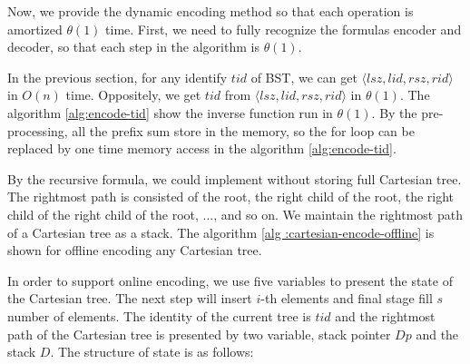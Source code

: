 Now, we provide the dynamic encoding method so that each operation is
amortized $\theta(1)$ time.  First, we need to fully recognize the
formulas encoder and decoder, so that each step in the algorithm is
$\theta(1)$.

In the previous section, for any identify $\mathit{tid}$ of BST, we
can get $\langle\mathit{lsz}, \mathit{lid}, \mathit{rsz},
\mathit{rid}\rangle$ in $O(n)$ time.  Oppositely, we get
$\mathit{tid}$ from $\langle\mathit{lsz}, \mathit{lid}, \mathit{rsz},
\mathit{rid}\rangle$ in $\theta(1)$.  The algorithm
\ref{alg:encode-tid} show the inverse function run in $\theta(1)$.  By
the pre-processing, all the prefix sum store in the memory, so the for
loop can be replaced by one time memory access in the algorithm
\ref{alg:encode-tid}.

\iffalse

接下來的幾段中，我們提供動態的編碼方式使得每一操作皆均攤 $\theta(1)$
完成。首先，我們需要充分認知編碼相互轉換的公式，藉以在算法中完成每一步
皆為 $\theta(1)$ 的要求。

在上一節提出對於任意編號 $\mathit{tid}$ 可以在 $O(n)$ 時間內得到
$\langle\mathit{lsz},\mathit{lid},\mathit{rsz},\mathit{rid}\rangle$；
相反地，可以在 $\theta(1)$ 時間內逆推得到 $\mathit{tid}$，如算法
~\ref{alg:encode-tid}。透過預處理，事先將所有前綴和保存下來，在算法中
的迴圈可視為一次內存存取，使得時間複雜度 $\theta(1)$。\fi



By the recursive formula, we could implement without storing full
Cartesian tree.  The rightmost path is consisted of the root, the
right child of the root, the right child of the right child of the
root, ..., and so on.  We maintain the rightmost path of a Cartesian
tree as a stack.  The algorithm \ref{alg :cartesian-encode-offline} is
shown for offline encoding any Cartesian tree.

\iffalse
根據先前的字典順序編碼，只需要維護笛卡爾樹的右鏈，實作上與堆疊結構相同。
基於 row-major 順序和遞迴定義 ~\ref{fun:LCA}，修改之前論文對於的離線編碼，
其對應方案如算法 \ref{alg:cartesian-encode-offline}。
\fi



In order to support online encoding, we use five variables to present
the state of the Cartesian tree.  The next step will insert $i$-th
elements and final stage fill $s$ number of elements.  The identity of
the current tree is $\mathit{tid}$ and the rightmost path of the
Cartesian tree is presented by two variable, stack pointer
$\mathit{Dp}$ and the stack $\mathit{D}$. The structure of state is as
follows:

